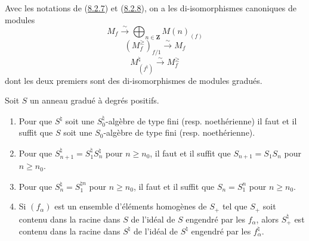 \begin{lemma}[8.2.9]
\label{II.8.2.9-fr}
Avec les notations de (\hyperref[II.8.2.7-fr]{8.2.7}) et
(\hyperref[II.8.2.8-fr]{8.2.8}), on a les di-isomorphismes canoniques de
modules
\begin{equation}
\label{II.8.2.9.1-fr}
  M_f\xrightarrow{\sim}\bigoplus_{n\in\mathbf{Z}}M(n)_{(f)}
\tag{8.2.9.1}
\end{equation}
\begin{equation}
\label{II.8.2.9.2-fr}
  (M_f^{\geq})_{f/1}\xrightarrow{\sim}M_f
\tag{8.2.9.2}
\end{equation}
\begin{equation}
\label{II.8.2.9.3-fr}
  M^\natural_{(f^\natural)}\xrightarrow{\sim}M_f^{\geq}
\tag{8.2.9.3}
\end{equation}
dont les deux premiers sont des di-isomorphismes de modules gradués.
\end{lemma}

\begin{lemma}[8.2.10]
\label{II.8.2.10-fr}
Soit $S$ un anneau gradué à degrés positifs.
\begin{enumerate}
\item[\rm(i)] Pour que $S^\natural$ soit une $S_0^\natural$-algèbre de type
fini (resp. noethérienne) il faut et il suffit que $S$ soit une $S_0$-algèbre
de type fini (resp. noethérienne).
\item[\rm(ii)] Pour que $S_{n+1}^\natural=S_1^\natural S_n^\natural$ pour
$n\geq n_0$, il faut et il suffit que $S_{n+1}=S_1S_n$ pour $n\geq n_0$.
\item[\rm(iii)] Pour que $S_n^\natural=S_1^{\natural n}$ pour $n\geq n_0$, il
faut et il suffit que $S_n=S_1^n$ pour $n\geq n_0$.
\item[\rm(iv)] Si $(f_\alpha)$ est un ensemble d'éléments homogènes de $S_+$
tel que $S_+$ soit contenu dans la racine dans $S$ de l'idéal de $S$ engendré par
les $f_\alpha$, alors $S_+^\natural$ est contenu dans la racine dans $S^\natural$ de
l'idéal de $S^\natural$ engendré par les $f_\alpha^\natural$.
\end{enumerate}
\end{lemma}

